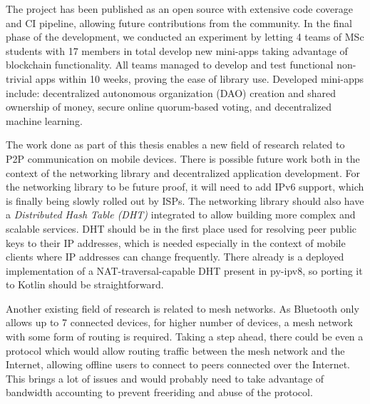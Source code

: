 The project has been published as an open source with extensive code coverage and CI pipeline, allowing future contributions from the community. In the final phase of the development, we conducted an experiment by letting 4 teams of MSc students with 17 members in total develop new mini-apps taking advantage of blockchain functionality. All teams managed to develop and test functional non-trivial apps within 10 weeks, proving the ease of library use.
Developed mini-apps include: decentralized autonomous organization (DAO) creation and shared ownership of money, secure online quorum-based voting, and decentralized machine learning.


The work done as part of this thesis enables a new field of research related to P2P communication on mobile devices. There is possible future work both in the context of the networking library and decentralized application development. For the networking library to be future proof, it will need to add IPv6 support, which is finally being slowly rolled out by ISPs. The networking library should also have a \textit{Distributed Hash Table (DHT)} integrated to allow building more complex and scalable services. DHT should be in the first place used for resolving peer public keys to their IP addresses, which is needed especially in the context of mobile clients where IP addresses can change frequently. There already is a deployed implementation of a NAT-traversal-capable DHT present in py-ipv8, so porting it to Kotlin should be straightforward.

Another existing field of research is related to mesh networks. As Bluetooth only allows up to 7 connected devices, for higher number of devices, a mesh network with some form of routing is required. Taking a step ahead, there could be even a protocol which would allow routing traffic between the mesh network and the Internet, allowing offline users to connect to peers connected over the Internet. This brings a lot of issues and would probably need to take advantage of bandwidth accounting to prevent freeriding and abuse of the protocol.

